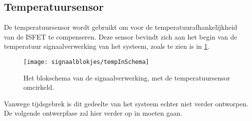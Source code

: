 \subsection{Temperatuursensor}
De temperatuursensor wordt gebruikt om voor de temperatuurafhankelijkheid van de ISFET te compenseren. Deze sensor bevindt zich aan het begin van de temperatuur signaalverwerking van het systeem, zoals te zien is in \cref{fig:tempInSchema}.

\begin{figure}[!htb]
    \centering
    \texttt{[image: signaalblokjes/tempInSchema]}
    \caption{Het blokschema van de signaalverwerking, met de temperatuursensor omcirkeld.}
    \label{fig:tempInSchema}
\end{figure}

Vanwege tijdsgebrek is dit gedeelte van het systeem echter niet verder ontworpen. De volgende ontwerpfase zal hier verder op in moeten gaan.